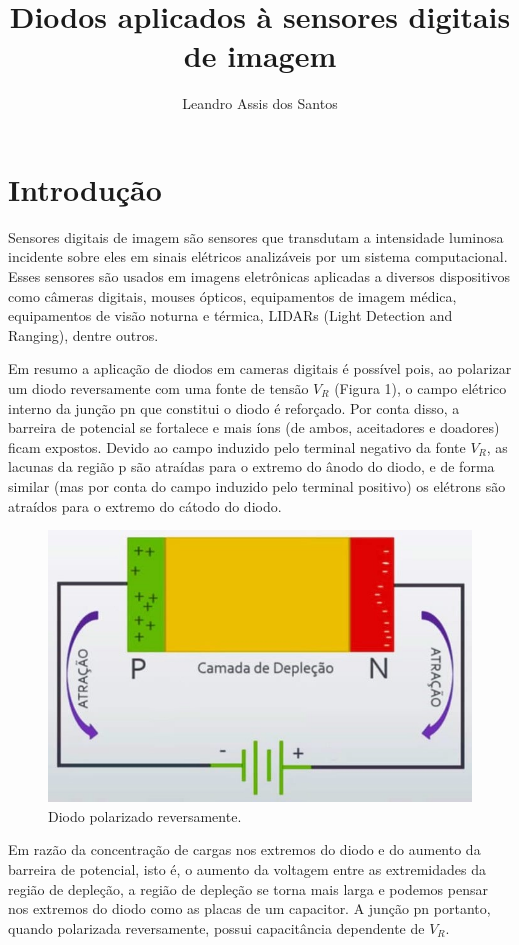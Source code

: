 \documentclass[10pt,a4paper,twocolumn]{article}
\title{\textbf{Diodos aplicados à sensores digitais de imagem}}
\author{Leandro Assis dos Santos}
\begin{document}
\maketitle

\section*{Introdução}
		Sensores digitais de imagem são sensores que transdutam a intensidade luminosa incidente sobre eles em sinais elétricos analizáveis por um sistema computacional. Esses sensores são usados em imagens eletrônicas aplicadas a diversos dispositivos como câmeras digitais, mouses ópticos, equipamentos de imagem médica, equipamentos de visão noturna e térmica, LIDARs (Light Detection and Ranging), dentre outros.
				
		Em resumo a aplicação de diodos em cameras digitais é possível pois, ao polarizar um diodo reversamente com uma fonte de tensão $V_{R}$ (Figura 1), o campo elétrico interno da junção pn que constitui o diodo é reforçado. Por conta disso, a barreira de potencial se fortalece e mais íons (de ambos, aceitadores e doadores) ficam expostos. Devido ao campo induzido pelo terminal negativo da fonte $V_{R}$, as lacunas da região p são atraídas para o extremo do ânodo do diodo, e de forma similar (mas por conta do campo induzido pelo terminal positivo) os elétrons são atraídos para o extremo do cátodo do diodo.
		
		\begin{figure}[!h]
			\centering
			\includegraphics[scale=0.3]{imagens/diodo_polarizado_reversamente.jpg}
			\caption{Diodo polarizado reversamente.}
		\end{figure}
		Em razão da concentração de cargas nos extremos do diodo e do aumento da barreira de potencial, isto é, o aumento da voltagem entre as extremidades da região de depleção, a região de depleção se torna mais larga e podemos pensar nos extremos do diodo como as placas de um capacitor. A junção pn portanto, quando polarizada reversamente, possui capacitância dependente de $V_{R}$.
		
\end{document}
